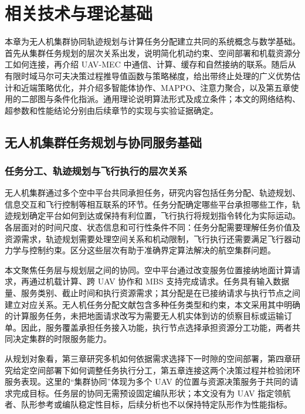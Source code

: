 \chapter{相关技术与理论基础}
\label{cha:related-technologies}

本章为无人机集群协同轨迹规划与计算任务分配建立共同的系统概念与数学基础。首先从集群任务规划的层次关系出发，说明简化机动约束、空间部署和机载资源分工如何连接，再介绍 UAV-MEC 中通信、计算、缓存和自然接纳的联系。随后从有限时域马尔可夫决策过程推导值函数与策略梯度，给出带终止处理的广义优势估计和近端策略优化，并介绍多智能体协作、MAPPO、注意力聚合，以及第五章使用的二部图与条件化指派。通用理论说明算法形式及成立条件；本文的网络结构、超参数和性能结论分别由后续章节的实现与实验证据确定。



\section{无人机集群任务规划与协同服务基础}
\label{sec:ch2-swarm-planning}

\subsection{任务分工、轨迹规划与飞行执行的层次关系}
\label{sec:ch2-swarm-levels}

无人机集群通过多个空中平台共同承担任务，研究内容包括任务分配、轨迹规划、信息交互和飞行控制等相互联系的环节\cite{chung2018swarm}。任务分配确定哪些平台承担哪些工作，轨迹规划确定平台如何到达或保持有利位置，飞行执行将规划指令转化为实际运动。各层面对的时间尺度、状态信息和可行性条件不同：任务分配需要理解任务价值及资源需求，轨迹规划需要处理空间关系和机动限制，飞行执行还需要满足飞行器动力学与控制约束。区分这些层次有助于准确界定算法解决的航空集群问题。

本文聚焦任务层与规划层之间的协同。空中平台通过改变服务位置接纳地面计算请求，再通过机载计算、跨 UAV 协作和 MBS 支持完成请求。任务具有输入数据量、服务类别、截止时间和执行资源需求；其分配是在已接纳请求与执行节点之间建立对应关系。无人机任务分配文献包含多种任务类型和约束\cite{skaltsis2023allocation}，本文采用其中明确的计算服务任务，未把地面请求改写为需要无人机实体到访的侦察目标或运输订单。因此，服务覆盖承担任务接入功能，执行节点选择承担资源分工功能，两者共同决定集群的时限服务能力。

从规划对象看，第三章研究多机如何依据需求选择下一时隙的空间部署，第四章研究给定空间部署下如何调整任务执行分工，第五章连接这两个决策过程并检验闭环服务表现。这里的“集群协同”体现为多个 UAV 的位置与资源决策服务于共同的请求完成目标。任务层的协同无需预设固定编队形状；本文没有为 UAV 指定领航者、队形参考或编队稳定性目标，后续分析也不以保持特定队形作为性能指标。

